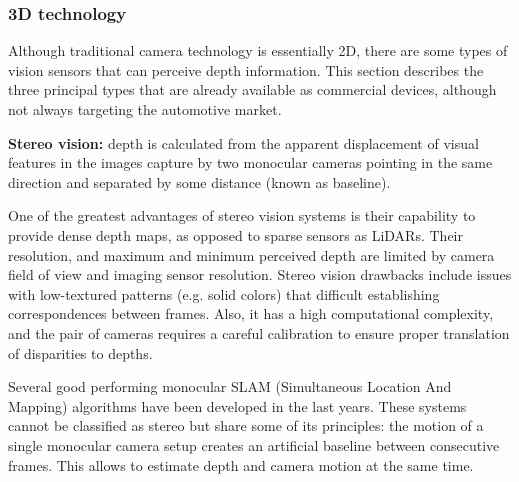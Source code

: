 \subsubsection{3D technology}
Although traditional camera technology is essentially 2D, there are some
types of vision sensors that can perceive depth information. This section
describes the three principal types that are already available as commercial
devices, although not always targeting the automotive market.



\textbf{Stereo vision:} depth is calculated \cite{Hamzah2016} from the 
apparent displacement of visual features in the images capture by two 
monocular cameras pointing in the same direction and separated by some
distance (known as baseline). 
    
        
One of the greatest advantages of stereo vision systems is their capability 
to provide dense depth maps, as opposed to sparse sensors as LiDARs. Their
resolution, and maximum and minimum perceived depth are limited by
camera field of view and imaging sensor resolution.     
Stereo vision drawbacks include issues with low-textured patterns 
(e.g. solid colors) that difficult establishing correspondences between
frames. Also, it has a high computational complexity, and the pair of 
cameras requires a careful calibration to ensure proper translation of 
disparities to depths.

Several good performing monocular SLAM (Simultaneous Location And Mapping)
algorithms \cite{Engel2014}\cite{Engel2018} have been developed in the last
years. 
These systems cannot be classified as stereo but share some of its principles: 
the motion of a single monocular camera setup creates an artificial baseline
between consecutive frames. This allows to estimate depth and camera motion at
the same time.
  
